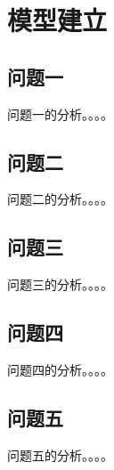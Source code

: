 \section{模型建立}    
    \subsection{问题一}
        问题一的分析。。。。
    \subsection{问题二}
        问题二的分析。。。。
    \subsection{问题三}
        问题三的分析。。。。
    \subsection{问题四}
        问题四的分析。。。。
    \subsection{问题五}
        问题五的分析。。。。    